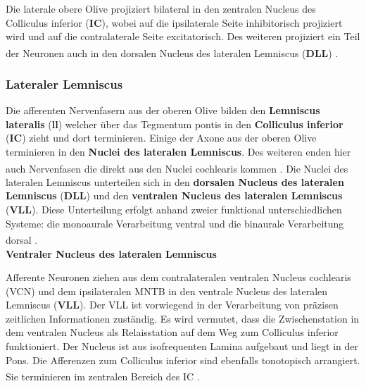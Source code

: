 \documentclass[12pt,a4paper,pdftex]{article}
\begin{document}
Die laterale obere Olive projiziert bilateral in den zentralen Nucleus des Colliculus inferior (\textbf{IC}), wobei auf die ipsilaterale Seite inhibitorisch projiziert wird und auf die contralaterale Seite excitatorisch.
Des weiteren projiziert ein Teil der Neuronen auch in den dorsalen Nucleus des lateralen Lemniscus (\textbf{DLL}) \textsuperscript{\cite[29]{paxinos2014rat}}.

\subsubsection*{Lateraler Lemniscus}

Die afferenten Nervenfasern aus der oberen Olive bilden den \textbf{Lemniscus lateralis} (\textbf{ll}) welcher über das Tegmentum pontis in den \textbf{Colliculus inferior} (\textbf{IC}) zieht und dort terminieren. Einige der Axone aus der oberen Olive terminieren in den \textbf{Nuclei des lateralen Lemniscus}. Des weiteren enden hier auch Nervenfasen die direkt aus den Nuclei cochlearis kommen \textsuperscript{\cite[10]{crossman2014neuroanatomy}}. 
Die Nuclei des lateralen Lemniscus unterteilen sich in den \textbf{dorsalen Nucleus des lateralen Lemniscus} (\textbf{DLL}) und den \textbf{ventralen Nucleus des lateralen Lemniscus} (\textbf{VLL}). Diese Unterteilung erfolgt anhand zweier funktional unterschiedlichen Systeme: die monoaurale Verarbeitung ventral und die binaurale Verarbeitung dorsal \textsuperscript{\cite[29]{paxinos2014rat}}. 
\\

\textbf{Ventraler Nucleus des lateralen Lemniscus}

Afferente Neuronen ziehen aus dem contralateralen ventralen Nucleus cochlearis (VCN) und dem ipsilateralen MNTB in den ventrale Nucleus des lateralen Lemniscus (\textbf{VLL}). Der VLL ist vorwiegend in der Verarbeitung von präzisen zeitlichen Informationen zuständig.
Es wird vermutet, dass die Zwischenstation in dem ventralen Nucleus als Relaisstation auf dem Weg zum Colliculus inferior funktioniert.
Der Nucleus ist aus isofrequenten Lamina aufgebaut und liegt in der Pons. Die Afferenzen zum Colliculus inferior sind ebenfalls tonotopisch arrangiert. Sie terminieren im zentralen Bereich des IC \textsuperscript{\cite[29]{paxinos2014rat}}.
\\
\end{document}

